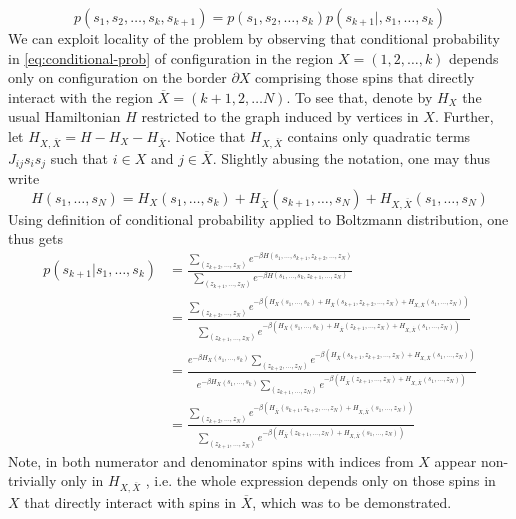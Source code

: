 \begin{equation}
  \label{eq:conditional-prob}
  p(s_1, s_2, \ldots, s_k, s_{k+1}) = p(s_1, s_2, \ldots, s_k)p(s_{k+1}|, s_1, \ldots, s_k)
\end{equation}
We can exploit locality of the problem by observing that conditional
probability in \eqref{eq:conditional-prob} of configuration in the region $X =
  (1, 2, \ldots, k)$ depends only on configuration on the border $\partial X$ comprising those spins that directly interact with the region
$\overline{X} = (k+1, 2, \ldots N)$. To see that, denote by $H_X$ the usual
    Hamiltonian $H$ restricted to the graph induced by vertices in $X$. Further,
    let $H_{X, \overline{X}} = H - H_X - H_{\overline{X}}$. Notice that $H_{X,
    \overline{X}}$ contains only quadratic terms $J_{ij} s_i s_j$ such that $i \in
  X$ and $j \in \overline{X}$. Slightly abusing the notation, one may thus write
    \begin{equation}
      H(s_1, \ldots, s_N) = H_X(s_1, \ldots, s_k) + H_{\overline{X}}(s_{k+1}, \ldots, s_N) + H_{X, \overline{X}}(s_1, \ldots, s_N)
    \end{equation}
    Using definition of conditional probability applied to Boltzmann distribution,
    one thus gets
    \begin{align}
      p(s_{k+1}|s_1, \ldots, s_k) & = \frac{\sum\limits_{(z_{k+2}, \ldots, z_N)}e^{-\beta H(s_1, \ldots, s_{k+1}, z_{k+2},\ldots,z_N)}}{\sum\limits_{(z_{k+1}, \ldots, z_N)}e^{-\beta H(s_1, \ldots, s_k, z_{k+1},\ldots,z_N)}}                                                                                                                                                     \\
                                  & = \frac{\sum\limits_{(z_{k+2}, \ldots, z_N)}e^{-\beta (H_X(s_1, \ldots, s_k) + H_{\overline{X}}(s_{k+1}, z_{k+2},\ldots,z_N) + H_{X, \overline{X}}(s_1, \ldots, z_N))}}{\sum\limits_{(z_{k+1}, \ldots, z_N)}e^{-\beta (H_X(s_1, \ldots, s_k) + H_{\overline{X}}(z_{k+1}, \ldots,z_N) + H_{X, \overline{X}}(s_1, \ldots, z_N))}}                 \\
                                  & = \frac{e^{-\beta H_X(s_1, \ldots, s_k)}\sum\limits_{(z_{k+2}, \ldots, z_N)} e^{-\beta(H_{\overline{X}}(s_{k+1}, z_{k+2},\ldots,z_N) + H_{X, \overline{X}}(s_1, \ldots, z_N))}}{e^{-\beta H_X(s_1, \ldots, s_k)}\sum\limits_{(z_{k+1}, \ldots, z_N)}e^{ -\beta(H_{\overline{X}}(z_{k+1}, \ldots,z_N) + H_{X, \overline{X}}(s_1, \ldots, z_N))}} \\
                                  & = \frac{\sum\limits_{(z_{k+2}, \ldots, z_N)} e^{-\beta(H_{\overline{X}}(s_{k+1}, z_{k+2},\ldots,z_N) + H_{X, \overline{X}}(s_1, \ldots, z_N))}}{\sum\limits_{(z_{k+1}, \ldots, z_N)}e^{ -\beta(H_{\overline{X}}(z_{k+1}, \ldots,z_N) + H_{X, \overline{X}}(s_1, \ldots, z_N))}}
    \end{align}
    Note, in both numerator and denominator spins with indices from $X$ appear
    non-trivially only in $H_{X, \overline{X}}$ , i.e. the whole expression depends
    only on those spins in $X$ that directly interact with spins in $\overline{X}$,
which was to be demonstrated.

